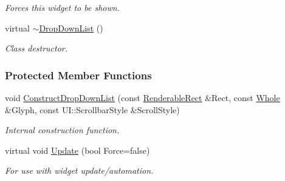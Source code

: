 \begin{DoxyCompactItemize}
\begin{DoxyCompactList}\small\item\em Forces this widget to be shown. \item\end{DoxyCompactList}\item 
\hypertarget{classphys_1_1UI_1_1DropDownList_abef8eec322f0e2a6af99aac6bfc3a6eb}{
virtual \hyperlink{classphys_1_1UI_1_1DropDownList_abef8eec322f0e2a6af99aac6bfc3a6eb}{$\sim$DropDownList} ()}
\label{classphys_1_1UI_1_1DropDownList_abef8eec322f0e2a6af99aac6bfc3a6eb}

\begin{DoxyCompactList}\small\item\em Class destructor. \item\end{DoxyCompactList}\end{DoxyCompactItemize}
\subsubsection*{Protected Member Functions}
\begin{DoxyCompactItemize}
\item 
\hypertarget{classphys_1_1UI_1_1DropDownList_a2e0988db883971424579bfc4b8536065}{
void \hyperlink{classphys_1_1UI_1_1DropDownList_a2e0988db883971424579bfc4b8536065}{ConstructDropDownList} (const \hyperlink{structphys_1_1UI_1_1RenderableRect}{RenderableRect} \&Rect, const \hyperlink{namespacephys_a460f6bc24c8dd347b05e0366ae34f34a}{Whole} \&Glyph, const UI::ScrollbarStyle \&ScrollStyle)}
\label{classphys_1_1UI_1_1DropDownList_a2e0988db883971424579bfc4b8536065}

\begin{DoxyCompactList}\small\item\em Internal construction function. \item\end{DoxyCompactList}\item 
\hypertarget{classphys_1_1UI_1_1DropDownList_a1356da2f60b5ca6539f98a957b961d65}{
virtual void \hyperlink{classphys_1_1UI_1_1DropDownList_a1356da2f60b5ca6539f98a957b961d65}{Update} (bool Force=false)}
\label{classphys_1_1UI_1_1DropDownList_a1356da2f60b5ca6539f98a957b961d65}

\begin{DoxyCompactList}\small\item\em For use with widget update/automation. \item\end{DoxyCompactList}\end{DoxyCompactItemize}
